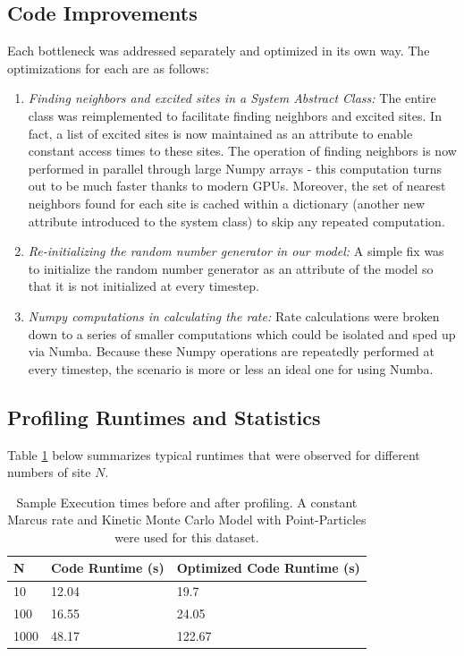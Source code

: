 \documentclass{article}
\begin{document}
\subsection{Code Improvements}
Each bottleneck was addressed separately and optimized in its own way. The optimizations for each are as follows:
\begin{enumerate}
    \item \textit{Finding neighbors and excited sites in a System Abstract Class:} The entire class was reimplemented to facilitate finding neighbors and excited sites. In fact, a list of excited sites is now maintained as an attribute to enable constant access times to these sites. The operation of finding neighbors is now performed in parallel through large Numpy arrays - this computation turns out to be much faster thanks to modern GPUs. Moreover, the set of nearest neighbors found for each site is cached within a dictionary (another new attribute introduced to the system class) to skip any repeated computation.
    \item \textit{Re-initializing the random number generator in  our model:} A simple fix was to initialize the random number generator as an attribute of the model so that it is not initialized at every timestep.
    \item \textit{Numpy computations in calculating the rate:} Rate calculations were broken down to a series of smaller computations which could be isolated and sped up via Numba. Because these Numpy operations are repeatedly performed at every timestep, the scenario is more or less an ideal one for using Numba.
\end{enumerate}

\subsection{Profiling Runtimes and Statistics}
Table \ref{tab:prof} below summarizes typical runtimes that were observed for different numbers of site $N$. 

\begin{table}[H]
\centering
\begin{tabular}{l | l | l}
N & Code Runtime (s) & Optimized Code Runtime (s) \\
\hline
10 & 12.04 & 19.7 \\
100 & 16.55 & 24.05 \\
1000 & 48.17 & 122.67 \\
\end{tabular}
\caption{Sample Execution times before and after profiling. A constant Marcus rate and Kinetic Monte Carlo Model with Point-Particles were used for this dataset.}
\label{tab:prof}
\end{table}
\end{document}
